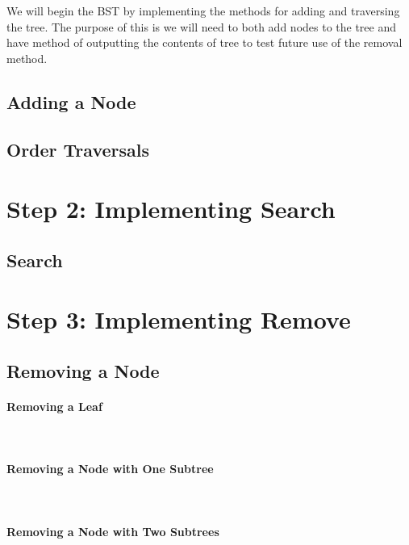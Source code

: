 \documentclass[a4paper]{article}
\begin{document}
We will begin the BST by implementing the methods for adding and traversing the
tree. The purpose of this is we will need to both add nodes to the tree and
have method of outputting the contents of tree to test future use of the
removal method.

\subsection{Adding a Node}\label{sec:adding}


\subsection{Order Traversals}\label{sec:ordertraverse}

\newpage

\section{Step 2: Implementing Search}
\subsection{Search}\label{sec:search}


\newpage
\section{Step 3: Implementing Remove}
\subsection{Removing a Node}\label{sec:remove}

\newpage

\paragraph{Removing a Leaf}\hfill\\



\paragraph{Removing a Node with One Subtree}\hfill\\



\newpage
\paragraph{Removing a Node with Two Subtrees}\hfill\\
\end{document}
